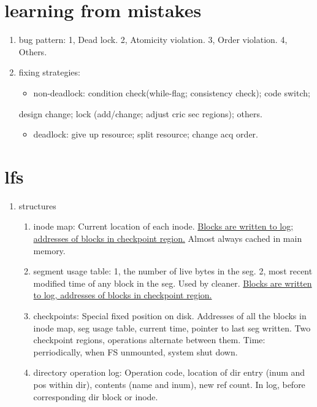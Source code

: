 \documentclass[9pt,conference]{IEEEtran}
\begin{document}
\section{learning from mistakes}
\label{sec-3}
\begin{enumerate}
\item bug pattern:
\label{sec-3-1}
1, Dead lock. 2, Atomicity violation. 3, Order violation. 4, Others.
\item fixing strategies:
\label{sec-3-2}
\begin{itemize}
\item non-deadlock: condition check(while-flag; consistency check); code switch;
\end{itemize}
design change; lock (add/change; adjust cric sec regions); others.
\begin{itemize}
\item deadlock: give up resource; split resource; change acq order.
\end{itemize}
\end{enumerate}
\section{lfs}
\label{sec-4}
\begin{enumerate}
\item structures
\label{sec-4-1}
\begin{enumerate}
\item inode map:
\label{sec-4-1-1}
Current location of each inode.
\uline{Blocks are written to log; addresses of blocks in checkpoint region.}
Almost always cached in main memory.
\item segment usage table:
\label{sec-4-1-2}
1, the number of live bytes in the seg.
2, most recent modified time of any block in the seg.
Used by cleaner.
\uline{Blocks are written to log, addresses of blocks in checkpoint region.}
\item checkpoints:
\label{sec-4-1-3}
Special fixed position on disk.
Addresses of all the blocks in inode map, seg usage table, current time, pointer to last seg written.
Two checkpoint regions, operations alternate between them.
Time: perriodically, when FS unmounted, system shut down.
\item directory operation log:
\label{sec-4-1-4}
Operation code, location of dir entry (inum and pos within dir), contents (name and inum), new ref count.
In log, before corresponding dir block or inode.
\end{enumerate}
\end{enumerate}
\end{document}
